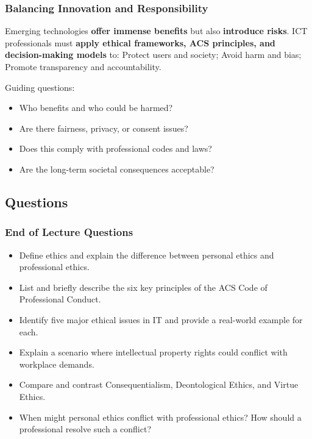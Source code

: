 \subsubsection{Balancing Innovation and Responsibility}

\indent 

Emerging technologies \textbf{offer immense benefits} but also \textbf{introduce risks}. ICT professionals must \textbf{apply ethical frameworks, ACS principles, and decision-making models} to: Protect users and society; Avoid harm and bias; Promote transparency and accountability.


Guiding questions:

\begin{itemize}
    \item Who benefits and who could be harmed?
    \item Are there fairness, privacy, or consent issues?
    \item Does this comply with professional codes and laws?
    \item Are the long-term societal consequences acceptable?
\end{itemize}

\subsection{Questions}

\subsubsection{End of Lecture Questions}

\begin{itemize}
    \item Define ethics and explain the difference between personal ethics and professional ethics.
    \item List and briefly describe the six key principles of the ACS Code of Professional Conduct.
    \item Identify five major ethical issues in IT and provide a real-world example for each.
    \item Explain a scenario where intellectual property rights could conflict with workplace demands.
    \item Compare and contrast Consequentialism, Deontological Ethics, and Virtue Ethics.
    \item When might personal ethics conflict with professional ethics? How should a professional resolve such a conflict?
\end{itemize}


